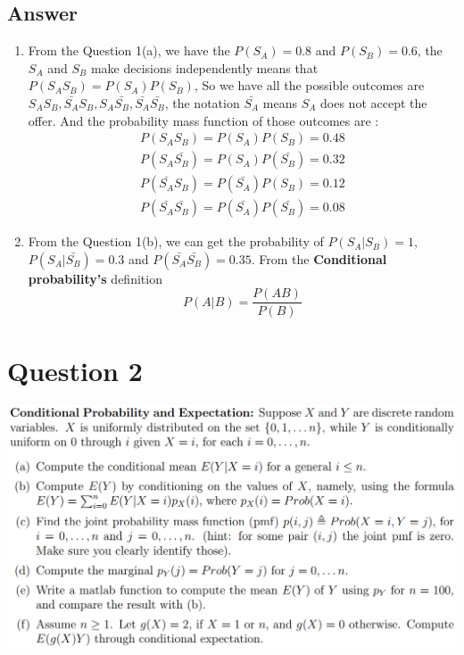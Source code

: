 \documentclass[
	12pt, %
]{fphw}
\begin{document}
\subsection*{Answer}
\begin{enumerate}
    \item From the Question 1(a), we have the $P(S_A)=0.8$ and $P(S_B)=0.6$, the $S_A$ and $S_B$ make decisions independently means that $P(S_AS_B)=P(S_A)P(S_B)$, So we have all the possible outcomes are $S_AS_B, \bar{S_A}S_B, S_A\bar{S_B}, \bar{S_A}\bar{S_B}$, the notation $\bar{S_A}$ means $S_A$ does not accept the offer. And the probability mass function of those outcomes are :
    \begin{equation}\nonumber
        \begin{array}{c}
        P(S_AS_B)=P(S_A)P(S_B)=0.48 \\
        P(S_A\bar{S_B})=P(S_A)P(\bar{S_B})=0.32\\
        P(\bar{S_A}S_B)=P(\bar{S_A})P(S_B)=0.12\\
        P(\bar{S_A}\bar{S_B})=P(\bar{S_A})P(\bar{S_B})=0.08
    \end{array}   
    \end{equation}
    
    \item From the Question 1(b), we can get the probability of $P(S_A|S_B)=1$, $P(S_A|\bar{S_B})=0.3$ and $P(\bar{S_A}\bar{S_B})=0.35$. From the \textbf{Conditional probability's} definition
    \begin{equation}\nonumber
        P(A|B) = \frac{P(AB)}{P(B)}
    \end{equation}
\end{enumerate}
\clearpage
\section*{Question 2}
\begin{problem}
	\includegraphics[width=440pt]{img/q2.png}
\end{problem}
\end{document}
